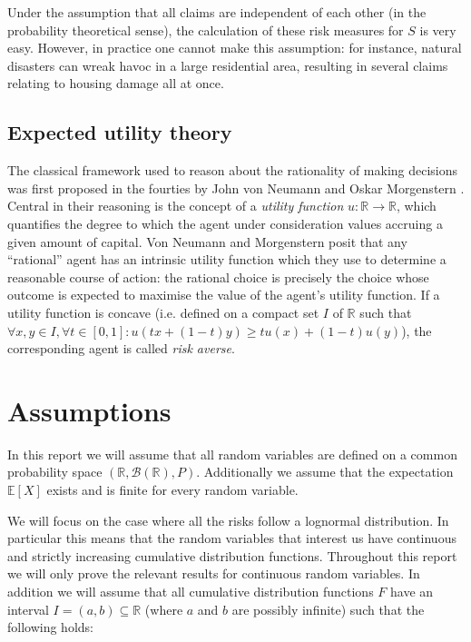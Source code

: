 \documentclass{article}
\begin{document}
Under the assumption that all claims are independent of each other (in the probability theoretical sense), the calculation of these risk measures for $S$ is very easy. However, in practice one cannot make this assumption: for instance, natural disasters can wreak havoc in a large residential area, resulting in several claims relating to housing damage all at once.


\subsection{Expected utility theory} 
The classical framework used to reason about the rationality of making decisions was first proposed in the fourties by John von Neumann and Oskar Morgenstern \cite{theoryOfGamesAndEconomicBehavior}. Central in their reasoning is the concept of a \textit{utility function} $u: \mathbb{R} \to \mathbb{R}$, which quantifies the degree to which the agent under consideration values accruing a given amount of capital. Von Neumann and Morgenstern posit that any ``rational'' agent has an intrinsic utility function which they use to determine a reasonable course of action: the rational choice is precisely the choice whose outcome is expected to maximise the value of the agent's utility function. If a utility function is concave (i.e. defined on a compact set $I$ of $\mathbb{R}$ such that $\forall x, y \in I, \forall t \in [0, 1]: u(tx + (1-t)y) \geq t u(x) + (1-t) u(y)$), the corresponding agent is called \textit{risk averse}.



\section{Assumptions}\label{section: assumptions}
In this report we will assume that all random variables are defined on a common probability space $(\mathbb{R}, \mathcal{B}(\mathbb{R}),P)$. Additionally we assume that the expectation $\mathbb{E}[X]$ exists and is finite for every random variable.

We will focus on the case where all the risks follow a lognormal distribution. In particular this means that the random variables that interest us have continuous and strictly increasing cumulative distribution functions. Throughout this report we will only prove the relevant results for continuous random variables. In addition we will assume that all cumulative distribution functions $F$ have an interval $I = (a,b)\subseteq \mathbb{R}$ (where $a$ and $b$ are possibly infinite) such that the following holds:
\end{document}
